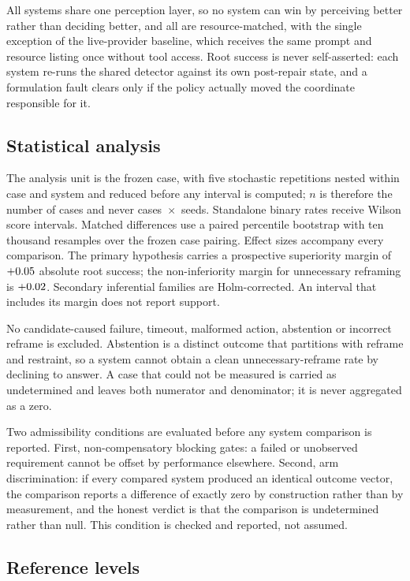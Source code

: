 All systems share one perception layer, so no system can win by perceiving
better rather than deciding better, and all are resource-matched, with the
single exception of the live-provider baseline, which receives the same prompt
and resource listing once without tool access. Root success is never
self-asserted: each system re-runs the shared detector against its own
post-repair state, and a formulation fault clears only if the policy actually
moved the coordinate responsible for it.

\subsection{Statistical analysis}

The analysis unit is the frozen case, with five stochastic repetitions nested
within case and system and reduced before any interval is computed; $n$ is
therefore the number of cases and never cases~$\times$~seeds. Standalone binary
rates receive Wilson score intervals. Matched differences use a paired
percentile bootstrap with ten thousand resamples over the frozen case pairing.
Effect sizes accompany every comparison. The primary hypothesis carries a
prospective superiority margin of $+0.05{}$ absolute root success;
the non-inferiority margin for unnecessary reframing is $+0.02{}$.
Secondary inferential families are Holm-corrected. An interval that includes its
margin does not report support.

No candidate-caused failure, timeout, malformed action, abstention or incorrect
reframe is excluded. Abstention is a distinct outcome that partitions with
reframe and restraint, so a system cannot obtain a clean unnecessary-reframe
rate by declining to answer. A case that could not be measured is carried as
undetermined and leaves both numerator and denominator; it is never aggregated
as a zero.

Two admissibility conditions are evaluated before any system comparison is
reported. First, non-compensatory blocking gates: a failed or unobserved
requirement cannot be offset by performance elsewhere. Second, arm
discrimination: if every compared system produced an identical outcome vector,
the comparison reports a difference of exactly zero by construction rather than
by measurement, and the honest verdict is that the comparison is undetermined
rather than null. This condition is checked and reported, not assumed.

\subsection{Reference levels}

